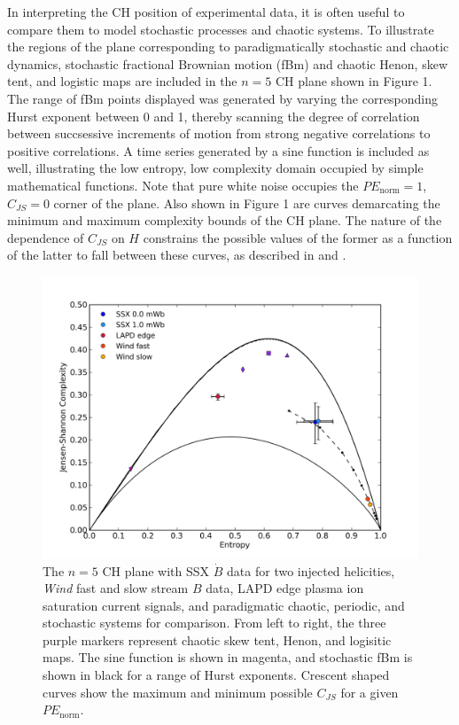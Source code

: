 \documentclass[aps,twocolumn,secnumarabic,nobalancelastpage,amsmath,amssymb,
nofootinbib]{revtex4-1}
\begin{document}
In interpreting the CH position of experimental data, it is often useful to compare them to model  stochastic processes and chaotic systems. To illustrate the regions of the plane corresponding to paradigmatically stochastic and chaotic dynamics, stochastic fractional Brownian motion (fBm) and chaotic Henon, skew tent, and logistic maps are included in the $n=5$ CH plane shown in Figure 1. The range of fBm points displayed was generated by varying the corresponding Hurst exponent between 0 and 1, thereby scanning the degree of correlation between succsessive increments of motion from strong negative correlations to positive correlations. A time series generated by a sine function is included as well, illustrating the low entropy, low complexity domain occupied by simple mathematical functions. Note that pure white noise occupies the $PE_{\text{norm}}=1$, $C_{JS}=0$ corner of the plane. Also shown in Figure 1 are curves demarcating the minimum and maximum complexity bounds of the CH plane. The nature of the dependence of $C_{JS}$ on $H$ constrains the possible values of the former as a function of the latter to fall between these curves, as described in \cite{lopez1995} and \cite{calbet2001}.
\begin{figure}[!htbp]
\centerline{
\includegraphics[width=17cm]{fig1.png}}
\caption{\label{Figure 1} The $n=5$ CH plane  with SSX $\dot{B}$ data for two injected helicities, \textit{Wind} fast and slow stream $B$ data, LAPD edge plasma ion saturation current signals, and paradigmatic chaotic, periodic, and stochastic systems for comparison. From left to right, the three purple markers represent chaotic skew tent, Henon, and logisitic maps. The sine function is shown in magenta, and stochastic fBm is shown in black for a range of Hurst exponents. Crescent shaped curves show the maximum and minimum possible $C_{JS}$ for a given $PE_{\text{norm}}$.}
\end{figure}
\end{document}
